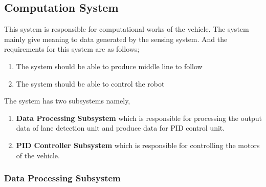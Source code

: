 \documentclass[a4paper,12pt]{article}
\begin{document}


\subsection{Computation System}




This system is responsible for computational works of the vehicle. The system mainly give meaning to data generated by the sensing system. And the requirements for this system are as follows; 


\begin{enumerate}

\item The system should	be able to produce middle line to follow

\item The system should be able to control the robot

\end{enumerate}	


The system has two subsystems namely,


\begin{enumerate}

\item \textbf{Data Processing Subsystem} which is responsible for processing the output data of lane detection unit and produce data for PID control unit.

\item \textbf{PID Controller Subsystem} which is responsible for controlling the motors of the vehicle.

\end{enumerate}




\subsubsection{Data Processing Subsystem}\label{sect:dataProcessingSubsystem}
\end{document}
